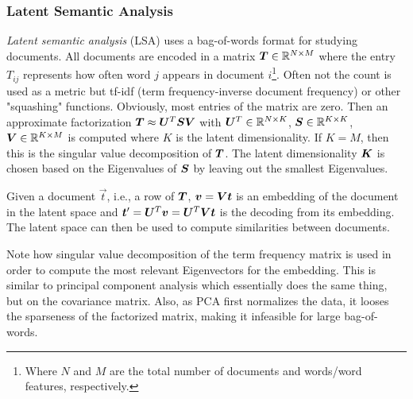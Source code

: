 			\subsubsection{Latent Semantic Analysis}
				\emph{Latent semantic analysis} (LSA) uses a bag-of-words format for studying documents. All documents are encoded in a matrix \( \bm{T} \in \mathbb{R}^{N \times M} \) where the entry \(T_{ij}\) represents how often word \(j\) appears in document \(i\)\footnote{Where \(N\) and \(M\) are the total number of documents and words/word features, respectively.}. Often not the count is used as a metric but tf-idf (term frequency-inverse document frequency) or other "squashing" functions. Obviously, most entries of the matrix are zero. Then an approximate factorization \( \bm{T} \approx \bm{U}^T \bm{S} \bm{V} \) with \( \bm{U}^T \in \mathbb{R}^{N \times K} \), \( \bm{S} \in \mathbb{R}^{K \times K} \), \( \bm{V} \in \mathbb{R}^{K \times M} \) is computed where \(K\) is the latent dimensionality. If \(K = M\), then this is the singular value decomposition of \(\bm{T}\). The latent dimensionality \(\bm{K}\) is chosen based on the Eigenvalues of \(\bm{S}\) by leaving out the smallest Eigenvalues.

				Given a document \(\vec{t}\), i.e., a row of \(\bm{T}\), \( \bm{v} = \bm{V} \bm{t} \) is an embedding of the document in the latent space and \( \bm{t}' = \bm{U}^T \bm{v} = \bm{U}^T \bm{V} \bm{t} \) is the decoding from its embedding. The latent space can then be used to compute similarities between documents.

				Note how singular value decomposition of the term frequency matrix is used in order to compute the most relevant Eigenvectors for the embedding. This is similar to principal component analysis which essentially does the same thing, but on the covariance matrix. Also, as PCA first normalizes the data, it looses the sparseness of the factorized matrix, making it infeasible for large bag-of-words.

